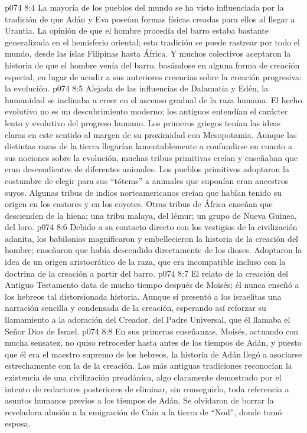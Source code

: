 \vs p074 8:4 \pc La mayoría de los pueblos del mundo se ha visto influenciada por la tradición de que Adán y Eva poseían formas físicas creadas para ellos al llegar a Urantia. La opinión de que el hombre procedía del barro estaba bastante generalizada en el hemisferio oriental; esta tradición se puede rastrear por todo el mundo, desde las islas Filipinas hasta África. Y muchos colectivos aceptaron la historia de que el hombre venía del barro, basándose en alguna forma de creación especial, en lugar de acudir a sus anteriores creencias sobre la creación progresiva: la evolución.
\vs p074 8:5 Alejada de las influencias de Dalamatia y Edén, la humanidad se inclinaba a creer en el ascenso gradual de la raza humana. El hecho evolutivo no es un descubrimiento moderno; los antiguos entendían el carácter lento y evolutivo del progreso humano. Los primeros griegos tenían las ideas claras en este sentido al margen de su proximidad con Mesopotamia. Aunque las distintas razas de la tierra llegarían lamentablemente a confundirse en cuanto a sus nociones sobre la evolución, muchas tribus primitivas creían y enseñaban que eran descendientes de diferentes animales. Los pueblos primitivos adoptaron la costumbre de elegir para sus “tótems” a animales que suponían eran ancestros suyos. Algunas tribus de indios norteamericanos creían que habían tenido su origen en los castores y en los coyotes. Otras tribus de África enseñan que descienden de la hiena; una tribu malaya, del lémur; un grupo de Nueva Guinea, del loro.
\vs p074 8:6 Debido a su contacto directo con los vestigios de la civilización adanita, los babilonios magnificaron y embellecieron la historia de la creación del hombre; enseñaron que había descendido directamente de los dioses. Adoptaron la idea de un origen aristocrático de la raza, que era incompatible incluso con la doctrina de la creación a partir del barro.
\vs p074 8:7 \pc El relato de la creación del Antiguo Testamento data de mucho tiempo después de Moisés; él nunca enseñó a los hebreos tal distorsionada historia. Aunque sí presentó a los israelitas una narración sencilla y condensada de la creación, esperando así reforzar su llamamiento a la adoración del Creador, del Padre Universal, que él llamaba el Señor Dios de Israel.
\vs p074 8:8 En sus primeras enseñanzas, Moisés, actuando con mucha sensatez, no quiso retroceder hasta antes de los tiempos de Adán, y puesto que él era el maestro supremo de los hebreos, la historia de Adán llegó a asociarse estrechamente con la de la creación. Las más antiguas tradiciones reconocían la existencia de una civilización preadánica, algo claramente demostrado por el intento de redactores posteriores de eliminar, sin conseguirlo, toda referencia a asuntos humanos previos a los tiempos de Adán. Se olvidaron de borrar la reveladora alusión a la emigración de Caín a la tierra de “Nod”, donde tomó esposa.
